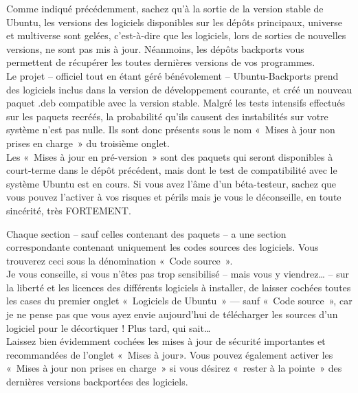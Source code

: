 Comme indiqué précédemment, sachez qu'à la sortie de la version stable de Ubuntu, les versions des logiciels disponibles sur les dépôts principaux, universe et multiverse sont gelées, c'est-à-dire que les logiciels, lors de sorties de nouvelles versions, ne sont pas mis à jour. Néanmoins, les dépôts backports vous permettent de récupérer les toutes dernières versions de vos programmes.\\
Le projet -- officiel tout en étant géré bénévolement -- Ubuntu-Backports prend des logiciels inclus dans la version de développement courante, et créé un nouveau paquet .deb compatible avec la version stable. Malgré les tests intensifs effectués sur les paquets recréés, la probabilité qu'ils causent des instabilités sur votre système n'est pas nulle. Ils sont donc présents sous le nom «~Mises à jour non prises en charge~» du troisième onglet.\\
Les «~Mises à jour en pré-version~» sont des paquets qui seront disponibles à court-terme dans le dépôt précédent, mais dont le test de compatibilité avec le système Ubuntu est en cours. Si vous avez l'âme d'un béta-testeur, sachez que vous pouvez l'activer à vos risques et périls mais je vous le déconseille, en toute sincérité, très FORTEMENT.\par
Chaque section -- sauf celles contenant des paquets  -- a une section correspondante contenant uniquement les codes sources des logiciels. Vous trouverez ceci sous la dénomination «~Code source~».\\
Je vous conseille, si vous n'êtes pas trop sensibilisé -- mais vous y viendrez\ldots{} -- sur la liberté et les licences des différents logiciels à installer, de laisser cochées toutes les cases du premier onglet «~Logiciels de Ubuntu~» --- sauf «~Code source~», car je ne pense pas que vous ayez envie aujourd'hui de télécharger les sources d'un logiciel pour le décortiquer ! Plus tard, qui sait\ldots{}\\
Laissez bien évidemment cochées les mises à jour de sécurité importantes et recommandées de l'onglet «~Mises à jour». Vous pouvez également activer les «~Mises à jour non prises en charge~» si vous désirez «~rester à la pointe~» des dernières versions backportées des logiciels.
